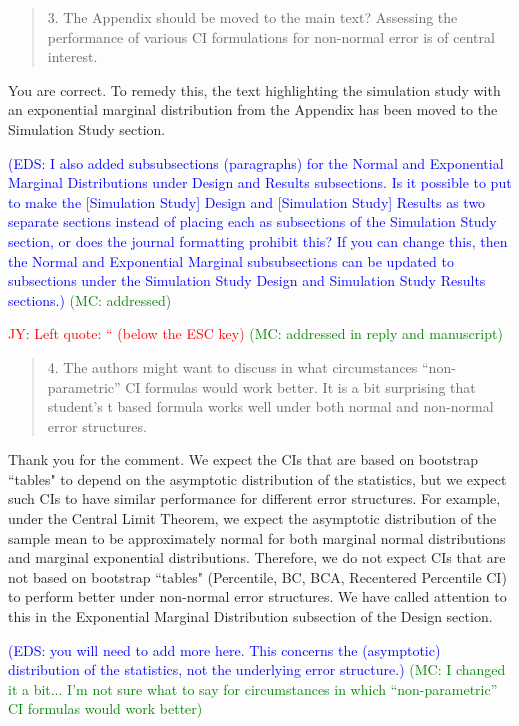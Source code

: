 \documentclass[12pt]{article}
\newcommand{\jy}[1]{\textcolor{red}{JY: #1}}
\newcommand{\eds}[1]{\textcolor{blue}{(EDS: #1)}}
\newcommand{\mc}[1]{\textcolor{green}{(MC: #1)}}
\newenvironment{comment}%
{\begin{quotation}\noindent\small\it\color{darkblue}\ignorespaces%
}{\end{quotation}}
\begin{document}
\begin{comment}
3. The Appendix should be moved to the main text? Assessing the performance of 
various CI formulations for non-normal error is of central interest.
\end{comment} 

You are correct. To remedy this, the text highlighting the simulation study with 
an exponential marginal 
distribution from the Appendix has been moved to the Simulation Study 
section. 

\eds{I also added subsubsections (paragraphs) for the Normal and Exponential 
Marginal Distributions under Design and Results subsections.
Is it possible to put to make the [Simulation Study] Design and 
[Simulation Study] Results as two separate 
sections instead of placing each as subsections of the Simulation Study section,
or does the journal formatting prohibit this?  If you can change this, then the 
Normal and Exponential Marginal subsubsections can be updated to subsections
under the Simulation Study Design and Simulation Study Results sections.}  
\mc{addressed}


\jy{Left quote: `` (below the ESC key)}
\mc{addressed in reply and manuscript}

\begin{comment}
4. The authors might want to discuss in what circumstances “non-parametric” CI 
formulas would work better. It is a bit surprising that student’s t based 
formula works well under both normal and non-normal error structures.
\end{comment}

Thank you for the comment. We expect the CIs that 
are based on bootstrap 
``tables" to depend on the 
asymptotic distribution of the statistics, but we expect such CIs to 
have similar performance for different error structures. For example, under the 
Central
Limit Theorem, we expect the asymptotic distribution of the sample mean to be 
approximately 
normal for both marginal normal distributions and marginal exponential 
distributions. Therefore, we do not expect CIs that are not based on bootstrap
``tables" (Percentile, BC, BCA, Recentered Percentile CI) to perform better 
under
non-normal error structures. We have called attention to this in the Exponential
Marginal Distribution subsection of the Design section.

\eds{you will need to add more here.  This concerns the
(asymptotic) distribution of the statistics, not the underlying error 
structure.}
\mc{I changed it a bit... I'm not sure what to say for circumstances in which
“non-parametric” CI 
formulas would work better}
\end{document}
